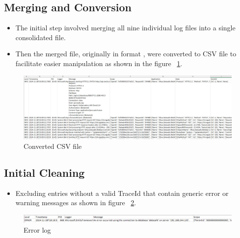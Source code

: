 \subsection{Merging and Conversion}
\begin{itemize}
	\item The initial step involved merging all nine individual log files into a single consolidated file. 
	\item Then the merged file, originally in format , were converted to CSV file to facilitate easier manipulation as shown in the figure ~\ref{csvFile}.
\end{itemize}

\begin{figure}
	\begin{center}
		\includegraphics[width=0.9\linewidth]{Images/csvFile.png}
		\caption{Converted CSV file}
		\label{csvFile} 
	\end{center}
\end{figure}

\subsection{Initial Cleaning}
\begin{itemize} 
	\item Excluding entries without a valid TraceId that contain generic error or warning messages as shown in figure ~\ref{error}.
\end{itemize}
\begin{figure}
	\begin{center}
		\includegraphics[width=0.9\linewidth]{Images/error.png}
		\caption{Error log}
		\label{error} 
	\end{center}
\end{figure}

